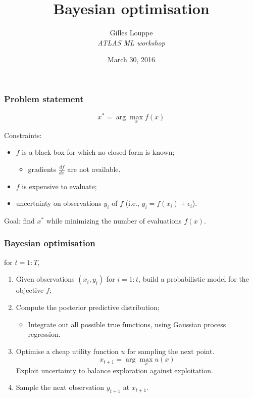 \documentclass{beamer}
\title{{\bf Bayesian optimisation}}
\author{
Gilles Louppe\\
{\it ATLAS ML workshop}
}
\date{March 30, 2016}
\begin{document}
\begin{frame}[plain]
\titlepage
\end{frame}

\begin{frame}
    \frametitle{Problem statement}

    \begin{center}
        $$x^* = \arg \max_x f(x)$$
    \end{center}

    \vspace{2em}

    Constraints:
    \begin{itemize}
        \item $f$ is a black box for which no closed form is known;
            \begin{itemize}
                \item gradients $\frac{df}{dx}$ are not available.
            \end{itemize}

        \item $f$ is expensive to evaluate;

        \item uncertainty on observations $y_i$ of $f$ (i.e., $y_i = f(x_i) + \epsilon_i$).
    \end{itemize}

    \vspace{2em}

    Goal: find $x^*$ while minimizing the number of evaluations $f(x)$.
\end{frame}

\begin{frame}
    \frametitle{Bayesian optimisation}

    for $t=1:T$,
    \begin{enumerate}
        \item Given observations $(x_i, y_i)$ for $i=1:t$, build a probabilistic model for the objective $f$;

            \vspace{1em}

        \item Compute the posterior predictive distribution;
            \begin{itemize}
                \item Integrate out all possible true functions, using
                Gaussian process regression.
            \end{itemize}

            \vspace{1em}

        \item Optimise a cheap utility  function $u$ for sampling the next point.
            $$x_{t+1} = \arg \max_x u(x)$$
            Exploit uncertainty to balance exploration against exploitation.

        \item Sample the next observation $y_{t+1}$ at $x_{t+1}$.
    \end{enumerate}

\end{frame}
\end{document}
